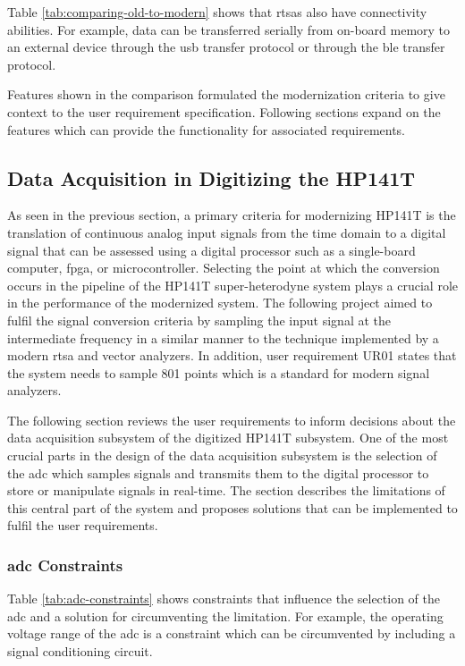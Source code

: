 \documentclass[class=report,11pt,crop=false]{standalone}
\begin{document}
	Table \ref{tab:comparing-old-to-modern} shows that \acrshort{rtsa}s also have connectivity abilities. For example, data can be transferred serially from on-board memory to an external device through the \acrshort{usb} transfer protocol or through the \acrshort{ble} transfer protocol. 
	
	Features shown in the comparison formulated the modernization criteria to give context to the user requirement specification. Following sections expand on the features which can provide the functionality for associated requirements. 
	
	\subsection{Data Acquisition in Digitizing the HP141T}
	
	As seen in the previous section, a primary criteria for modernizing HP141T is the translation of continuous analog input signals from the time domain to a digital signal that can be assessed using a digital processor such as a single-board computer, \acrshort{fpga}, or microcontroller. Selecting the point at which the conversion occurs in the pipeline of the HP141T super-heterodyne system plays a crucial role in the performance of the modernized system. The following project aimed to fulfil the signal conversion criteria by sampling the input signal at the intermediate frequency in a similar manner to the technique implemented by a modern \acrshort{rtsa} and vector analyzers. In addition, user requirement UR01 states that the system needs to sample 801 points which is a standard for modern signal analyzers.
	
	The following section reviews the user requirements to inform decisions about the data acquisition subsystem of the digitized HP141T subsystem. One of the most crucial parts in the design of the data acquisition subsystem is the selection of the \acrshort{adc} which samples signals and transmits them to the digital processor to store or manipulate signals in real-time. The section describes the limitations of this central part of the system and proposes solutions that can be implemented to fulfil the user requirements.
			
	\subsubsection{\acrshort{adc} Constraints}
	
	Table \ref{tab:adc-constraints} shows constraints that influence the selection of the \acrshort{adc} and a solution for circumventing the limitation. For example, the operating voltage range of the \acrshort{adc} is a constraint which can be circumvented by including a signal conditioning circuit.
	
\end{document}
